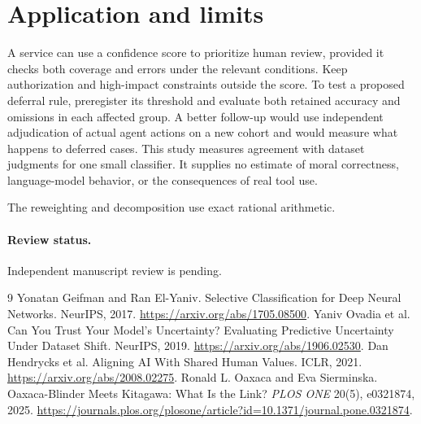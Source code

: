 \documentclass[11pt]{article}
\begin{document}
\section{Application and limits}
A service can use a confidence score to prioritize human review,
provided it checks both coverage and errors under the relevant
conditions. Keep authorization and high-impact constraints
outside the score. To test a proposed deferral rule, preregister
its threshold and evaluate both retained accuracy and omissions
in each affected group. A better follow-up would use independent
adjudication of actual agent actions on a new cohort and would
measure what happens to deferred cases. This study measures
agreement with dataset judgments for one small classifier.
It supplies no estimate of moral correctness, language-model
behavior, or the consequences of real tool use.

The reweighting and decomposition use exact rational arithmetic.

\paragraph{Review status.} Independent manuscript review is pending.

\begin{thebibliography}{9}
 Yonatan Geifman and Ran El-Yaniv.
Selective Classification for Deep Neural Networks. NeurIPS, 2017.
\url{https://arxiv.org/abs/1705.08500}.
 Yaniv Ovadia et al. Can You Trust Your Model's
Uncertainty? Evaluating Predictive Uncertainty Under Dataset Shift.
NeurIPS, 2019. \url{https://arxiv.org/abs/1906.02530}.
 Dan Hendrycks et al.
Aligning AI With Shared Human Values. ICLR, 2021.
\url{https://arxiv.org/abs/2008.02275}.
 Ronald L. Oaxaca and Eva Sierminska.
Oaxaca-Blinder Meets Kitagawa: What Is the Link?
\emph{PLOS ONE} 20(5), e0321874, 2025.
\url{https://journals.plos.org/plosone/article?id=10.1371/journal.pone.0321874}.
\end{thebibliography}
\end{document}

